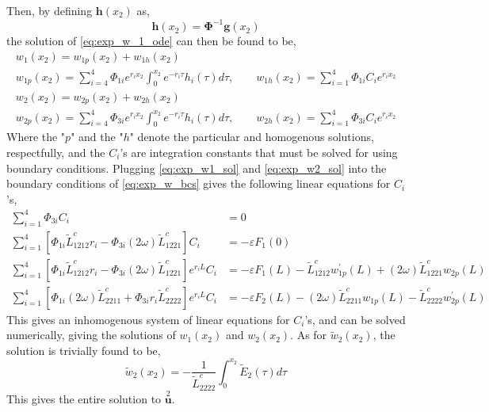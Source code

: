 \documentclass[11pt]{report}
\begin{document}
\begin{appendices}
Then, by defining $\mathbf{h}(x_2)$ as,
\begin{equation}
\mathbf{h}(x_2) = \mathbf{\Phi}^{-1} \mathbf{g}(x_2)
\end{equation}
the solution of \eqref{eq:exp_w_1_ode} can then be found to be,
\begin{equation} \label{eq:exp_w1_sol}
\begin{gathered}
w_1(x_2) = w_{1p}(x_2) + w_{1h}(x_2)  \\
w_{1p}(x_2) = \sum_{i = 4}^{4} \Phi_{1i} e^{r_i x_2} \int_{0}^{x_2} e^{-r_i \tau} h_i(\tau) d\tau , \qquad w_{1h}(x_2) = \sum_{i = 1}^{4} \Phi_{1i} C_{i} e^{r_i x_2}
\end{gathered}
\end{equation}
\begin{equation} \label{eq:exp_w2_sol}
\begin{gathered}
w_2(x_2) = w_{2p}(x_2) + w_{2h}(x_2)  \\
w_{2p}(x_2) = \sum_{i = 4}^{4} \Phi_{3i} e^{r_i x_2} \int_{0}^{x_2} e^{-r_i \tau} h_i(\tau) d\tau , \qquad w_{2h}(x_2) = \sum_{i = 1}^{4} \Phi_{3i} C_{i} e^{r_i x_2}
\end{gathered}
\end{equation}
Where the "$p$" and the "$h$" denote the particular and homogenous solutions, respectfully, and the $C_i$'s are integration constants that must be solved for using boundary conditions. Plugging \eqref{eq:exp_w1_sol} and \eqref{eq:exp_w2_sol} into the boundary conditions of \eqref{eq:exp_w_bcs} gives the following linear equations for $C_i$'s,
\begin{equation}
\begin{aligned}
\sum_{i = 1}^{4} \Phi_{3i} C_i &= 0 \\
\sum_{i = 1}^{4} \left[ \Phi_{1i} \tilde{L}^c_{1212} r_i - \Phi_{3i} (2 \omega) \tilde{L}^c_{1221} \right ] C_i &= - \varepsilon F_1(0) \\ 
\sum_{i = 1}^{4} \left[ \Phi_{1i} \tilde{L}^c_{1212} r_i - \Phi_{3i} (2 \omega) \tilde{L}^c_{1221} \right ]e^{r_i L} C_i &= - \varepsilon F_1(L) - \tilde{L}^c_{1212} w_{1p}^\prime(L) + (2 \omega) \tilde{L}^c_{1221} w_{2p}(L) \\
\sum_{i = 1}^{4} \left[ \Phi_{1i} (2 \omega) \tilde{L}^c_{2211} + \Phi_{3i} r_i \tilde{L}^c_{2222} \right ]e^{r_i L} C_i &= - \varepsilon F_2(L) - (2 \omega) \tilde{L}^c_{2211} w_{1p}(L) - \tilde{L}^c_{2222} w_{2p}^\prime(L)
\end{aligned}
\end{equation}
This gives an inhomogenous system of linear equations for $C_i$'s, and can be solved numerically, giving the solutions of $w_1(x_2)$ and $w_2(x_2)$. As for $\widetilde{w}_2(x_2)$, the solution is trivially found to be,
\begin{equation}
\widetilde{w}_2(x_2) = -\frac{1}{\tilde{L}^c_{2222}} \int_0^{x_2} \widetilde{E}_2(\tau) d\tau 
\end{equation}
This gives the entire solution to $\overset{2}{\mathbf{u}}$.


\end{appendices}
\end{document}
